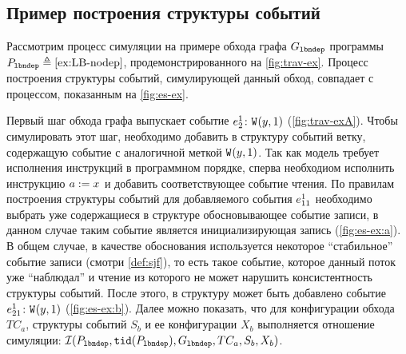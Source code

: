 
\subsection{Пример построения структуры событий}

Рассмотрим процесс симуляции на примере
обхода графа $G_{\mathtt{lbndep}}$ программы $P_{\mathtt{lbndep}} \triangleq \text{\ref{ex:LB-nodep}}$,
продемонстрированного на \cref{fig:trav-ex}.
Процесс построения структуры событий,
симулирующей данный обход, совпадает с процессом,
показанным на \cref{fig:es-ex}.



Первый шаг обхода графа выпускает событие
$e^{1}_{2}\colon {{\mathtt{W}}}^{}({y},{1}){}$ (\cref{fig:trav-exA}).
Чтобы симулировать этот шаг, необходимо добавить
в структуру событий ветку, содержащую событие
с аналогичной меткой ${{\mathtt{W}}}^{}({y},{1}){}$.
Так как модель \Wkm требует исполнения инструкций
в программном порядке, сперва необходиом исполнить  
инструкцию $a \;{:=}\;{x}^{}$ и добавить соответствующее событие чтения.
По правилам построения структуры событий \Wkm
для добавляемого события $e^{1}_{11}$ необходимо
выбрать уже содержащиеся в структуре обосновывающее событие записи,
в данном случае таким событие является
инициализирующая запись (\cref{fig:es-ex:a}).
В общем случае, в качестве обоснования используется
некоторое ``стабильное'' событие записи (смотри \cref{def:sjf}),
то есть такое событие, которое данный поток уже ``наблюдал''
и чтение из которого не может нарушить консистентность структуры событий.
После этого, в структуру может быть добавлено событие
$e^{1}_{21}\colon {{\mathtt{W}}}^{}({y},{1})$ (\cref{fig:es-ex:b}).
Далее можно показать, что для конфигурации обхода $TC_a$,
структуры событий $S_b$ и ее конфигурации $X_b$
выполняется отношение симуляции:
$\mathcal{I}(P_{\mathtt{lbndep}}, {\mathtt{tid}}(P_{\mathtt{lbndep}}), G_{\mathtt{lbndep}}, TC_a, S_b, X_b)$.


